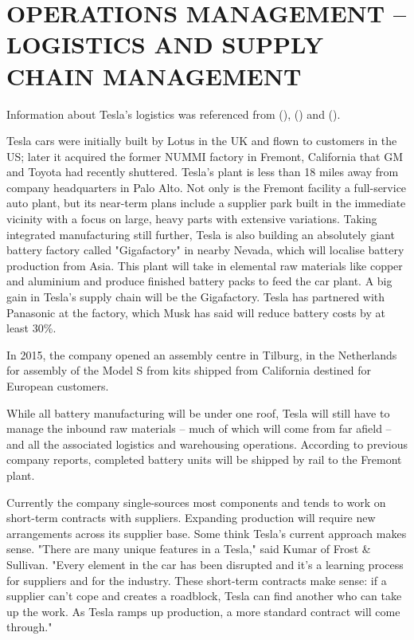 \documentclass[12pt]{article}
\begin{document}
\section{OPERATIONS MANAGEMENT – LOGISTICS AND SUPPLY CHAIN MANAGEMENT}

Information about Tesla's logistics was referenced from (\cite{ho16}), (\cite{om16}) and (\cite{ta14}).

Tesla cars were initially built by Lotus in the UK and flown to customers in the US; later it acquired the former NUMMI factory in Fremont, California that GM and Toyota had recently shuttered. Tesla's plant is less than 18 miles away from company headquarters in Palo Alto. Not only is the Fremont facility a full-service auto plant, but its near-term plans include a supplier park built in the immediate vicinity with a focus on large, heavy parts with extensive variations. Taking integrated manufacturing still further, Tesla is also building an absolutely giant battery factory called "Gigafactory" in nearby Nevada, which will localise battery production from Asia. This plant will take in elemental raw materials like copper and aluminium and produce finished battery packs to feed the car plant. A big gain in Tesla's supply chain will be the Gigafactory. Tesla has partnered with Panasonic at the factory, which Musk has said will reduce battery costs by at least 30\%.

In 2015, the company opened an assembly centre in Tilburg, in the Netherlands for assembly of the Model S from kits shipped from California destined for European customers.

While all battery manufacturing will be under one roof, Tesla will still have to manage the inbound raw materials – much of which will come from far afield – and all the associated logistics and warehousing operations. According to previous company reports, completed battery units will be shipped by rail to the Fremont plant.

Currently the company single-sources most components and tends to work on short-term contracts with suppliers. Expanding production will require new arrangements across its supplier base. Some think Tesla's current approach makes sense. "There are many unique features in a Tesla," said Kumar of Frost \& Sullivan. "Every element in the car has been disrupted and it's a learning process for suppliers and for the industry. These short-term contracts make sense: if a supplier can't cope and creates a roadblock, Tesla can find another who can take up the work. As Tesla ramps up production, a more standard contract will come through."
\end{document}

